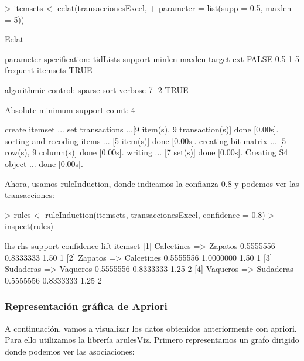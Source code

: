 \documentclass [a4paper] {article}
\begin{document}
\begin{Schunk}
\begin{Sinput}
> itemsets <- eclat(transaccionesExcel,
+ 		parameter = list(supp = 0.5, maxlen = 5))
\end{Sinput}
\begin{Soutput}
Eclat

parameter specification:
 tidLists support minlen maxlen            target  ext
    FALSE     0.5      1      5 frequent itemsets TRUE

algorithmic control:
 sparse sort verbose
      7   -2    TRUE

Absolute minimum support count: 4 

create itemset ... 
set transactions ...[9 item(s), 9 transaction(s)] done [0.00s].
sorting and recoding items ... [5 item(s)] done [0.00s].
creating bit matrix ... [5 row(s), 9 column(s)] done [0.00s].
writing  ... [7 set(s)] done [0.00s].
Creating S4 object  ... done [0.00s].
\end{Soutput}
\end{Schunk}

Ahora, usamos ruleInduction, donde indicamos la confianza 0.8 y podemos ver
las transacciones:

\begin{Schunk}
\begin{Sinput}
> rules <- ruleInduction(itemsets, transaccionesExcel, confidence = 0.8)
> inspect(rules)
\end{Sinput}
\begin{Soutput}
    lhs             rhs          support   confidence lift itemset
[1] {Calcetines} => {Zapatos}    0.5555556 0.8333333  1.50 1      
[2] {Zapatos}    => {Calcetines} 0.5555556 1.0000000  1.50 1      
[3] {Sudaderas}  => {Vaqueros}   0.5555556 0.8333333  1.25 2      
[4] {Vaqueros}   => {Sudaderas}  0.5555556 0.8333333  1.25 2      
\end{Soutput}
\end{Schunk}


\subsubsection{Representación gráfica de Apriori}
A continuación, vamos a visualizar los datos obtenidos anteriormente con apriori. Para ello
utilizamos la librería arulesViz. Primero representamos un grafo dirigido donde podemos ver
las asociaciones:
\end{document}
